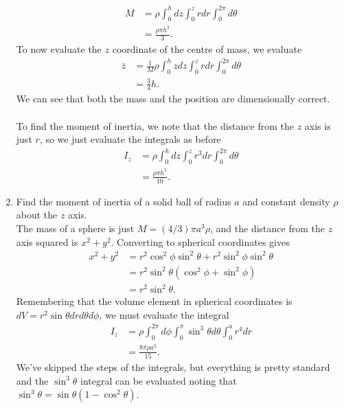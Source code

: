\documentclass{article}
\begin{document}
\begin{enumerate}
{			\begin{align*}
				M &= \rho \int_0^h dz \int_0^z r dr \int_0^{2\pi} d\theta \\
				&= \frac{\rho \pi h^3}{3} .
			\end{align*}
		To now evaluate the $z$ coordinate of the centre of mass, we evaluate 
			\begin{align*}
				\bar{z} &= \frac{1}{M} \rho \int_0^h z dz \int_0^z r dr \int_0^{2\pi} d\theta \\
				&= \frac{3}{4} h.
			\end{align*}
		We can see that both the mass and the position are dimensionally correct. \\ \\
		To find the moment of inertia, we note that the distance from the $z$ axis is just $r$, so we just evaluate the integrals as before
			\begin{align*}
				I_z &= \rho \int_0^h dz \int_0^z r^3 dr \int_0^{2\pi} d\theta \\
				&= \frac{\rho \pi h^5}{10} .
			\end{align*}
		 
	}
	\item{Find the moment of inertia of a solid ball of radius $a$ and constant density $\rho$ about the $z$ axis.\\
	The mass of a sphere is just $M = (4/3) \pi a^3 \rho$, and the distance from the $z$ axis squared is $x^2 + y^2$.  Converting to spherical coordinates gives 
		\begin{align*}
			x^2 + y^2 &= r^2 \cos^2 \phi \sin^2 \theta + r^2 \sin^2 \phi \sin^2 \theta \\
			&= r^2 \sin^2 \theta (\cos^2 \phi + \sin^2 \phi) \\
			&= r^2 \sin^2 \theta .
		\end{align*}
		Remembering that the volume element in spherical coordinates is $dV = r^2 \sin \theta dr d\theta d\phi$, we must evaluate the integral
		\begin{align*}
			I_z &= \rho \int_0^{2\pi} d\phi \int_0^{\pi} \sin^3 \theta d\theta \int_0^a r^4 dr \\
			&= \frac{8 \pi \rho a^3}{15}.
		\end{align*}
		We've skipped the steps of the integrals, but everything is pretty standard and the $\sin^3 \theta$ integral can be evaluated noting that $\sin^3 \theta = \sin \theta (1 - \cos^2 \theta)$.
	}
\end{enumerate}
\end{document}
